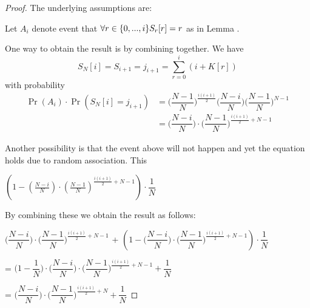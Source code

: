 	\begin{proof}
		The underlying assumptions are:
		
	

	    Let $ A_{i} $ denote event that $ \forall r \in \{0, ... , i\} S_{r}[r] = r $ as in Lemma .
	    
	    
		One way to obtain the result is by combining  together. We have
		\[ S_{N}[i] = S_{i+1} = j_{i+1} = \sum_{r=0}^{i}(i + K[r]) \]
		with probability 
		\begin{align*}
			 \Pr(A_{i})\cdot\Pr( S_{N}[i] = j_{i+1}) 
				 &= \bigg(\dfrac{N-1}{N}\bigg)^{\frac{i(i+1)}{2}}\bigg(\dfrac{N-i}{N}\bigg)\bigg(\dfrac{N-1}{N}\bigg)^{N-1} \\
				 &= \bigg(\dfrac{N-i}{N}\bigg)\cdot\bigg(\dfrac{N-1}{N}\bigg)^{\frac{i(i+1)}{2}+N-1}	
		\end{align*}
		
		Another possibility is that the event above will not happen and yet the equation holds due to random association. This 
		
		$ \left( 1 - \left(\frac{N-i}{N}\right)\cdot\left(\frac{N-1}{N}\right)^{\frac{i(i+1)}{2}+N-1} \right) \cdot \dfrac{1}{N} $
		
		
		By combining these we obtain the result as follows:
		
		$ \bigg(\dfrac{N-i}{N}\bigg)\cdot\bigg(\dfrac{N-1}{N}\bigg)^{\frac{i(i+1)}{2}+N-1} $
		+
			$ \left( 1 - \bigg(\dfrac{N-i}{N}\bigg)\cdot\bigg(\dfrac{N-1}{N}\bigg)^{\frac{i(i+1)}{2}+N-1} \right) \cdot \dfrac{1}{N} $
			
		= $ \bigg(1- \dfrac{1}{N}\bigg)	\cdot \bigg(\dfrac{N-i}{N}\bigg) \cdot \bigg(\dfrac{N-1}{N}\bigg)^{\frac{i(i+1)}{2}+N-1} + \dfrac{1}{N}$
		
		= $ \bigg(\dfrac{N-i}{N}\bigg) \cdot \bigg(\dfrac{N-1}{N}\bigg)^{\frac{i(i+1)}{2}+N} + \dfrac{1}{N}$
				
	\end{proof}
	
	

